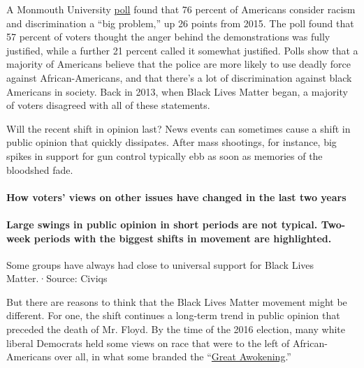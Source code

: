 A Monmouth University
\href{https://www.monmouth.edu/polling-institute/reports/monmouthpoll_us_060220/}{poll}
found that 76 percent of Americans consider racism and discrimination a
``big problem,'' up 26 points from 2015. The poll found that 57 percent
of voters thought the anger behind the demonstrations was fully
justified, while a further 21 percent called it somewhat justified.
Polls show that a majority of Americans believe that the police are more
likely to use deadly force against African-Americans, and that there's a
lot of discrimination against black Americans in society. Back in 2013,
when Black Lives Matter began, a majority of voters disagreed with all
of these statements.

Will the recent shift in opinion last? News events can sometimes cause a
shift in public opinion that quickly dissipates. After mass shootings,
for instance, big spikes in support for gun control typically ebb as
soon as memories of the bloodshed fade.

\hypertarget{how-voters-views-on-other-issues-have-changed-in-the-last-two-years}{%
\paragraph{How voters' views on other issues have changed in the last
two
years}\label{how-voters-views-on-other-issues-have-changed-in-the-last-two-years}}

\hypertarget{large-swings-in-public-opinion-in-short-periods-are-not-typical-two-week-periods-with-the-biggest-shifts-in-movement-are-highlighted}{%
\paragraph{Large swings in public opinion in short periods are not
typical. Two-week periods with the biggest shifts in movement are
highlighted.}\label{large-swings-in-public-opinion-in-short-periods-are-not-typical-two-week-periods-with-the-biggest-shifts-in-movement-are-highlighted}}

Some groups have always had close to universal support for Black Lives
Matter.·Source: Civiqs

But there are reasons to think that the Black Lives Matter movement
might be different. For one, the shift continues a long-term trend in
public opinion that preceded the death of Mr. Floyd. By the time of the
2016 election, many white liberal Democrats held some views on race that
were to the left of African-Americans over all, in what some branded the
``\href{https://www.vox.com/2019/3/22/18259865/great-awokening-white-liberals-race-polling-trump-2020}{Great
Awokening}.''

